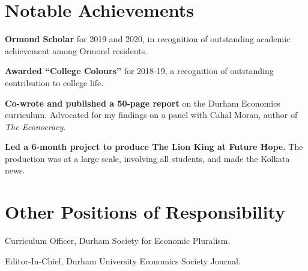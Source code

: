 \documentclass[a4]{article}
\renewenvironment{itemize}{
  \begin{list}{}{
    \setlength{\leftmargin}{1.5em}
  }
}{
  \end{list}
}
\begin{document}
\section*{Notable Achievements}
\begin{itemize}
\item \textbf{Ormond Scholar} for 2019 and 2020, in recognition of outstanding academic achievement among Ormond residents.
\item \textbf{Awarded ``College Colours''} for 2018-19, a recognition of outstanding contribution to college life.
\item \textbf{Co-wrote and published a 50-page report} on the Durham Economics curriculum. Advocated for my findings on a panel with Cahal Moran, author of \textit{The Econocracy}.
\item \textbf{Led a 6-month project to produce The Lion King at Future Hope.} The production was at a large scale, involving all students, and made the Kolkata news.
\end{itemize}

\section*{Other Positions of Responsibility}
\begin{itemize}
	\item Curriculum Officer, Durham Society for Economic Pluralism.%
\item Editor-In-Chief, Durham University Economics Society Journal.

\end{itemize}

\end{document}
